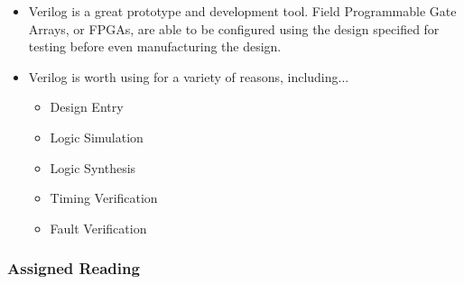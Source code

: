 \documentclass[10pt,a4paper]{article}
\begin{document}
\begin{itemize}
\item Verilog is a great prototype and development tool. Field Programmable Gate Arrays, or FPGAs, are able to be configured using the design specified for testing before even manufacturing the design.
\item Verilog is worth using for a variety of reasons, including...
\begin{itemize}
\item Design Entry
\item Logic Simulation
\item Logic Synthesis
\item Timing Verification
\item Fault Verification 
\end{itemize}
\end{itemize}
\subsubsection{Assigned Reading}
\end{document}
